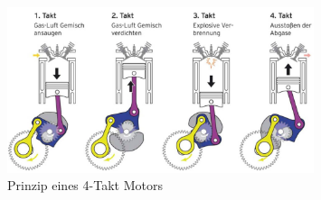 \begin{figure}[!htb]\centering
	\includegraphics[width=0.8\textwidth]{images/viertaktMotorPrinzip}
	\caption{Prinzip eines 4-Takt Motors \cite{SIMR.CH2-motorwirkungsgrad.4strokeEngine}}\label{Fig:img4strokeEngine}
\end{figure}

